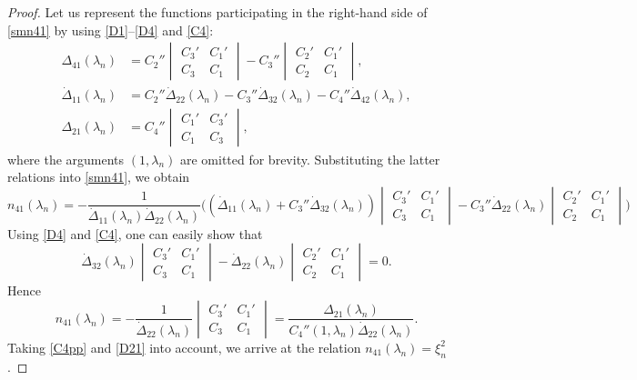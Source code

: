 \documentclass[a4paper,12pt]{article}
\newcommand{\la}{\lambda}
\theoremstyle{plain}
\numberwithin{equation}{section}
\theoremstyle{definition}
\theoremstyle{remark}
\begin{document}
\begin{proof}
Let us represent the functions participating in the right-hand side of \eqref{smn41} by using \eqref{D1}--\eqref{D4} and \eqref{C4}:
\begin{align*}
\Delta_{41}(\la_n) & = C_2'' \begin{vmatrix} C_3' & C_1' \\ C_3 & C_1 \end{vmatrix} - C_3'' \begin{vmatrix} C_2' & C_1'\\ C_2 & C_1 \end{vmatrix}, \\
\dot \Delta_{11}(\la_n) & = C_2'' \dot \Delta_{22}(\la_n) - C_3'' \dot \Delta_{32}(\la_n) - C_4'' \dot \Delta_{42}(\la_n), \\ 
\Delta_{21}(\la_n) & = C_4'' \begin{vmatrix}
C_1' & C_3' \\ C_1 & C_3
\end{vmatrix},
\end{align*}
where the arguments $(1, \la_n)$ are omitted for brevity.
Substituting the latter relations into \eqref{smn41}, we obtain
$$
n_{41}(\la_n) = -\frac{1}{\dot \Delta_{11}(\la_n) \dot \Delta_{22}(\la_n)} \biggl( (\dot \Delta_{11}(\la_n) + C_3'' \dot \Delta_{32}(\la_n)) \begin{vmatrix} C_3' & C_1' \\ C_3 & C_1\end{vmatrix} - C_3'' \dot \Delta_{22}(\la_n) \begin{vmatrix} C_2' & C_1' \\ C_2 & C_1 \end{vmatrix}\biggr)
$$
Using \eqref{D4} and \eqref{C4}, one can easily show that
$$
\dot \Delta_{32}(\la_n) \begin{vmatrix} C_3' & C_1' \\ C_3 & C_1 \end{vmatrix} - \dot \Delta_{22}(\la_n) \begin{vmatrix} C_2' & C_1' \\ C_2 & C_1 \end{vmatrix} = 0.
$$
Hence
$$
n_{41}(\la_n) = -\frac{1}{\dot \Delta_{22}(\la_n)} \begin{vmatrix} C_3' & C_1' \\ C_3 & C_1 \end{vmatrix} = \frac{\Delta_{21}(\la_n)}{C_4''(1, \la_n) \dot \Delta_{22}(\la_n)}.
$$
Taking \eqref{C4pp} and \eqref{D21} into account, we arrive at the relation $n_{41}(\la_n) = \xi_n^2$.


\end{proof}
\end{document}

